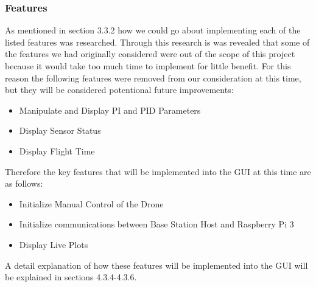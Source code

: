 \subsubsection{Features}
As mentioned in section 3.3.2 how we could go about implementing each of the listed features was researched. Through this research is was revealed that some of the features we had originally considered were out of the scope of this project because it would take too much time to implement for little benefit. For this reason the following features were removed from our consideration at this time, but they will be considered potentional future improvements: 
\begin{itemize}
	\item Manipulate and Display PI and PID Parameters
	\item Display Sensor Status
	\item Display Flight Time
\end{itemize}
Therefore the key features that will be implemented into the GUI at this time are as follows:
\begin{itemize}
	\item Initialize Manual Control of the Drone
	\item Initialize communications between Base Station Host and Raspberry Pi 3
	\item Display Live Plots
\end{itemize}
A detail explanation of how these features will be implemented into the GUI will be explained in sections 4.3.4-4.3.6.

